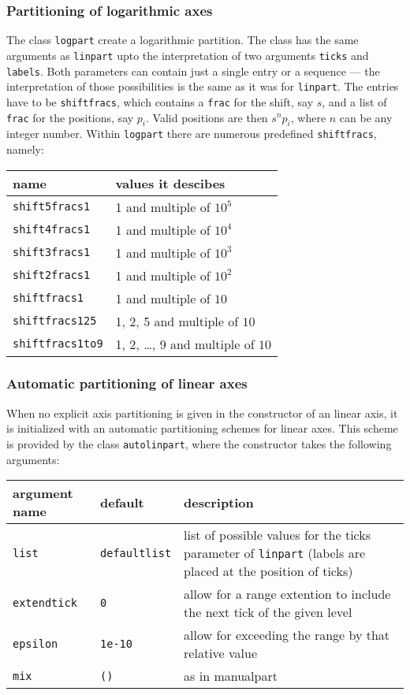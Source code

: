 \subsubsection{Partitioning of logarithmic axes}

The class \verb|logpart| create a logarithmic partition. The class has
the same arguments as \verb|linpart| upto the interpretation of two
arguments \verb|ticks| and \verb|labels|. Both parameters can contain
just a single entry or a sequence --- the interpretation of those
possibilities is the same as it was for \verb|linpart|. The entries
have to be \verb|shiftfracs|, which contains a \verb|frac| for the
shift, say $s$, and a list of \verb|frac| for the positions, say
$p_i$. Valid positions are then $s^np_i$, where $n$ can be any integer
number. Within \verb|logpart| there are numerous predefined
\verb|shiftfracs|, namely:

\begin{center}
\begin{tabular}{ll}
name&values it descibes\\
\hline
\texttt{shift5fracs1}&1 and multiple of $10^5$\\
\texttt{shift4fracs1}&1 and multiple of $10^4$\\
\texttt{shift3fracs1}&1 and multiple of $10^3$\\
\texttt{shift2fracs1}&1 and multiple of $10^2$\\
\texttt{shiftfracs1}&1 and multiple of $10$\\
\texttt{shiftfracs125}&1, 2, 5 and multiple of $10$\\
\texttt{shiftfracs1to9}&1, 2, \dots, 9 and multiple of $10$\\
\end{tabular}
\end{center}

\subsubsection{Automatic partitioning of linear axes}

When no explicit axis partitioning is given in the constructor of an
linear axis, it is initialized with an automatic partitioning schemes
for linear axes. This scheme is provided by the class
\verb|autolinpart|, where the constructor takes the following
arguments:

\medskip
\begin{tabularx}{\linewidth}{ll>{\raggedright\arraybackslash}X}
argument name&default&description\\
\hline
\texttt{list}&\texttt{defaultlist}&list of possible values for the ticks parameter of \texttt{linpart} (labels are placed at the position of ticks)\\
\texttt{extendtick}&\texttt{0}&allow for a range extention to include the next tick of the given level\\
\texttt{epsilon}&\texttt{1e-10}&allow for exceeding the range by that relative value\\
\texttt{mix}&\texttt{()}&as in manualpart\\
\end{tabularx}
\medskip

